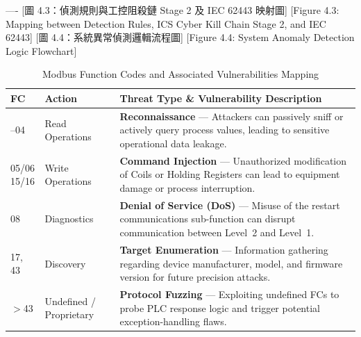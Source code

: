 ----
[圖 4.3：偵測規則與工控阻殺鏈 Stage 2 及 IEC 62443 映射圖] 
[Figure 4.3: Mapping between Detection Rules, ICS Cyber Kill Chain Stage 2, and IEC 62443]
[圖 4.4：系統異常偵測邏輯流程圖] 
[Figure 4.4: System Anomaly Detection Logic Flowchart]
\begin{table}[htbp]
\centering
\renewcommand{\arraystretch}{1.4}
\begin{tabularx}{\textwidth}{@{} >{\centering\arraybackslash}p{1.5cm} p{3.5cm} X @{}}
\toprule
\textbf{FC} & \textbf{Action} & \textbf{Threat Type \& Vulnerability Description} \\
\midrule

01--04
  & Read Operations
  & \textbf{Reconnaissance} --- Attackers can passively sniff or actively query process values,
    leading to sensitive operational data leakage. \\
\addlinespace

\shortstack{05/06 \\ 15/16}
  & Write Operations
  & \textbf{Command Injection} --- Unauthorized modification of Coils or Holding Registers can lead
    to equipment damage or process interruption. \\
\addlinespace

08
  & Diagnostics
  & \textbf{Denial of Service (DoS)} --- Misuse of the restart communications sub-function can disrupt
    communication between Level~2 and Level~1. \\
\addlinespace

17, 43
  & Discovery
  & \textbf{Target Enumeration} --- Information gathering regarding device manufacturer, model, and
    firmware version for future precision attacks. \\
\addlinespace

{$>$43}
  & Undefined / Proprietary
  & \textbf{Protocol Fuzzing} --- Exploiting undefined FCs to probe PLC response logic and trigger
    potential exception-handling flaws. \\

\bottomrule
\end{tabularx}
\caption{Modbus Function Codes and Associated Vulnerabilities Mapping}
\label{tab:modbus_fc_vuln}
\end{table}